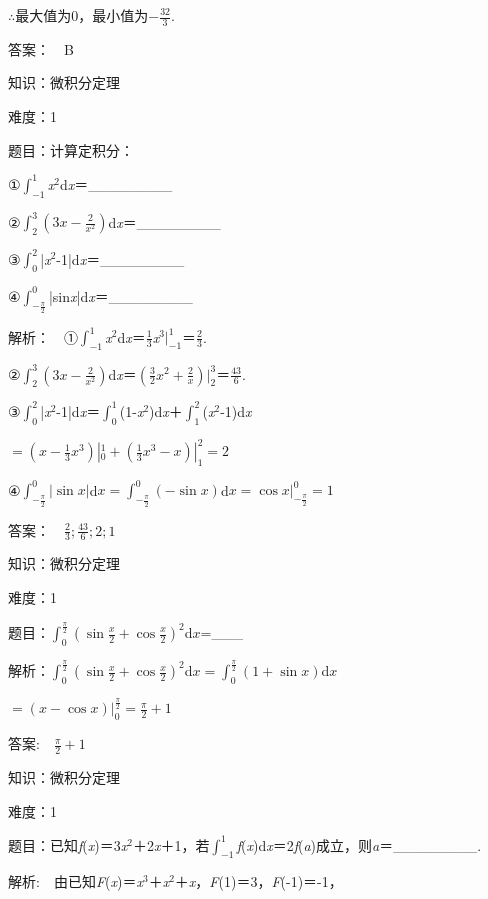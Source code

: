 \documentclass{article} %
\begin{document}
$\mathrm{\therefore}$最大值为0，最小值为$-\frac{32}{3}$.

 答案：　B



 知识：微积分定理

 难度：1

 题目：计算定积分：

①$\int_{-1}^{1}$\textit{x}${}^{2}$d\textit{x}＝\_\_\_\_\_\_\_\_

②$\int_2^3(3x-\frac{2}{x^2})$d\textit{x}＝\_\_\_\_\_\_\_\_

③$\int_0^2$|\textit{x}${}^{2}$-1|d\textit{x}＝\_\_\_\_\_\_\_\_

④$\int_{-\frac{\pi}{2}}^{0}$|sin\textit{x}|d\textit{x}＝\_\_\_\_\_\_\_\_

 解析：　①$\int_{-1}^{1}$\textit{x}${}^{2}$d\textit{x}＝$\frac{1}{3}$\textit{x}${}^{3}|_{-1}^1$＝$\frac{2}{3}$.

②$\int_2^3(3x-\frac{2}{x^2})$d\textit{x}＝$(\frac{3}{2}x^2+\frac{2}{x})|_2^3$＝$\frac{43}{6}$.

③$\int_0^2$|\textit{x}${}^{2}$-1|d\textit{x}＝$\int_0^1$(1-\textit{x}${}^{2}$)d\textit{x}＋$\int_1^2$(\textit{x}${}^{2}$-1)d\textit{x}

$=(x-\frac{1}{3}x^3)|_0^1+(\frac{1}{3}x^3-x)|_1^2=2$

④$\int_{-\frac{\pi}{2}}^{0}|\sin x|$d$x=\int_{-\frac{\pi}{2}}^{0}(-\sin x)$d$x=\cos x|_{-\frac{\pi}{2}}^0=1$


 答案：　$\frac{2}{3}; \frac{43}{6}; 2; 1$



 知识：微积分定理

 难度：1

 题目：$\int_0^{\frac{\pi}{2}}(\sin\frac{x}{2}+\cos\frac{x}{2})^2$d$x$=\_\_\_

 解析：$\int_0^{\frac{\pi}{2}}(\sin\frac{x}{2}+\cos\frac{x}{2})^2$d$x=\int_0^{\frac{\pi}{2}}(1+\sin x)$d$x$

$=(x-\cos x)|_0^{\frac{\pi}{2}}=\frac{\pi}{2}+1$

 答案:　$\frac{\pi}{2}+1$



 知识：微积分定理

 难度：1

 题目：已知\textit{f}(\textit{x})＝3\textit{x}${}^{2}$＋2\textit{x}＋1，若$\int_{-1}^{1}$\textit{f}(\textit{x})d\textit{x}＝2\textit{f}(\textit{a})成立，则\textit{a}＝\_\_\_\_\_\_\_\_.

 解析:　由已知\textit{F}(\textit{x})＝\textit{x}${}^{3}$＋\textit{x}${}^{2}$＋\textit{x}，\textit{F}(1)＝3，\textit{F}(-1)＝-1，
\end{document}
